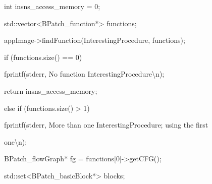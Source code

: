{{\bigskip



{

int insns_access_memory = 0;}





\bigskip



{

std::vector<BPatch_function*> functions;}



{

appImage->findFunction({\textquotedbl}InterestingProcedure{\textquotedbl}, functions);}





\bigskip



{

if (functions.size() == 0) {}



{

fprintf(stderr, {\textquotedbl}No function InterestingProcedure{\textbackslash}n{\textquotedbl});}



{

return insns_access_memory;}



{

} else if (functions.size() > 1) {}



{

fprintf(stderr, {\textquotedbl}More than one InterestingProcedure; using the first

one{\textbackslash}n{\textquotedbl});}



{

}}





\bigskip



{

BPatch_flowGraph* fg = functions[0]->getCFG();}





\bigskip



{

std::set<BPatch_basicBlock*> blocks;}



}}
